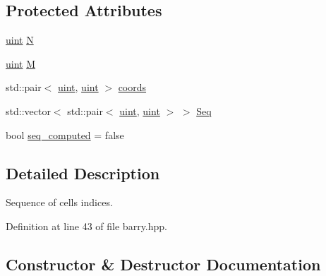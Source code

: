 \subsection*{Protected Attributes}
\begin{DoxyCompactItemize}
\item 
\hyperlink{namespacebarry_a11dfc53ddb4672278319aa04f1e09a6c}{uint} \hyperlink{classbarry_1_1_cell_seq_aa870f5b3789fc9abe1399351f443ccb0}{N}
\item 
\hyperlink{namespacebarry_a11dfc53ddb4672278319aa04f1e09a6c}{uint} \hyperlink{classbarry_1_1_cell_seq_acd15aaca4fc9160a7e89d68cec310fba}{M}
\item 
std\+::pair$<$ \hyperlink{namespacebarry_a11dfc53ddb4672278319aa04f1e09a6c}{uint}, \hyperlink{namespacebarry_a11dfc53ddb4672278319aa04f1e09a6c}{uint} $>$ \hyperlink{classbarry_1_1_cell_seq_a40aa32ec41df99a1db9a58fe578b543f}{coords}
\item 
std\+::vector$<$ std\+::pair$<$ \hyperlink{namespacebarry_a11dfc53ddb4672278319aa04f1e09a6c}{uint}, \hyperlink{namespacebarry_a11dfc53ddb4672278319aa04f1e09a6c}{uint} $>$ $>$ \hyperlink{classbarry_1_1_cell_seq_a4fa35bd68111dc58761e74aa1f9f01d3}{Seq}
\item 
bool \hyperlink{classbarry_1_1_cell_seq_ae494832512818af7c82315c7f5655db0}{seq\+\_\+computed} = false
\end{DoxyCompactItemize}


\subsection{Detailed Description}
Sequence of cells indices. 



Definition at line 43 of file barry.\+hpp.



\subsection{Constructor \& Destructor Documentation}
\mbox{\label{classbarry_1_1_cell_seq_a3f1fcc18a3e9a9572d403791368f0db7}} 
